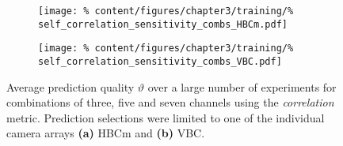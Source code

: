                 \begin{figure}[t]%
                    \centering%
                    \begin{subfigure}{0.47\textwidth}%
                        \texttt{[image: \%
                            content/figures/chapter3/training/\%
                            self\_correlation\_sensitivity\_combs\_HBCm.pdf]}%
                        \caption{}%
                    \end{subfigure}%
                    \hfill%
                    \begin{subfigure}{0.47\textwidth}%
                        \texttt{[image: \%
                            content/figures/chapter3/training/\%
                            self\_correlation\_sensitivity\_combs\_VBC.pdf]}%
                        \caption{}%
                    \end{subfigure}%
                    \caption{Average prediction quality $\vartheta$ over a large number of experiments for combinations of three, five and seven channels using the \textit{correlation} metric. Prediction selections were limited to one of the individual camera arrays \textbf{(a)} HBCm and \textbf{(b)} VBC.}\label{fig:results_correlation}%
                \end{figure}%
%
